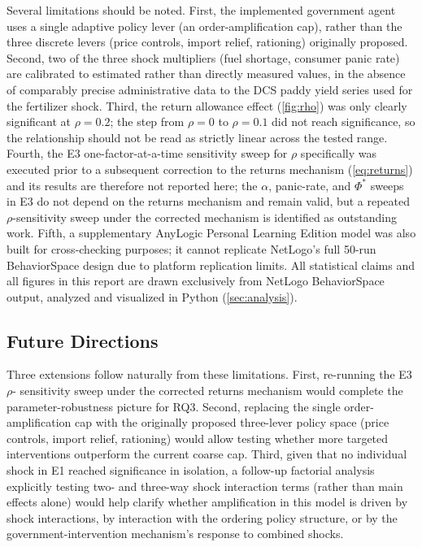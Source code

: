 \documentclass[final,onefignum,onetabnum]{siuro250211}
\begin{document}
Several limitations should be noted. First, the implemented government agent uses a single
adaptive policy lever (an order-amplification cap), rather than the three discrete levers (price
controls, import relief, rationing) originally proposed. Second, two of the three shock
multipliers (fuel shortage, consumer panic rate) are calibrated to estimated rather than directly
measured values, in the absence of comparably precise administrative data to the DCS paddy yield
series used for the fertilizer shock. Third, the return allowance effect (\cref{fig:rho}) was only
clearly significant at $\rho=0.2$; the step from $\rho=0$ to $\rho=0.1$ did not reach significance,
so the relationship should not be read as strictly linear across the tested range. Fourth, the E3
one-factor-at-a-time sensitivity sweep for $\rho$ specifically was executed prior to a
subsequent correction to the returns mechanism (\cref{eq:returns}) and its results are therefore
not reported here; the $\alpha$, panic-rate, and $\Phi^{*}$ sweeps in E3 do not depend on the
returns mechanism and remain valid, but a repeated $\rho$-sensitivity sweep under the corrected
mechanism is identified as outstanding work. Fifth, a supplementary AnyLogic Personal Learning
Edition model was also built for cross-checking purposes; it cannot replicate NetLogo's full
50-run BehaviorSpace design due to platform replication limits. All statistical claims and all
figures in this report are drawn exclusively from NetLogo BehaviorSpace output, analyzed and
visualized in Python (\cref{sec:analysis}).

\subsection{Future Directions}
\label{sec:future}

Three extensions follow naturally from these limitations. First, re-running the E3 $\rho$-
sensitivity sweep under the corrected returns mechanism would complete the parameter-robustness
picture for RQ3. Second, replacing the single order-amplification cap with the originally proposed
three-lever policy space (price controls, import relief, rationing) would allow testing whether
more targeted interventions outperform the current coarse cap. Third, given that no individual
shock in E1 reached significance in isolation, a follow-up factorial analysis explicitly testing
two- and three-way shock interaction terms (rather than main effects alone) would help clarify
whether amplification in this model is driven by shock interactions, by interaction with the
ordering policy structure, or by the government-intervention mechanism's response to combined
shocks.
\end{document}
